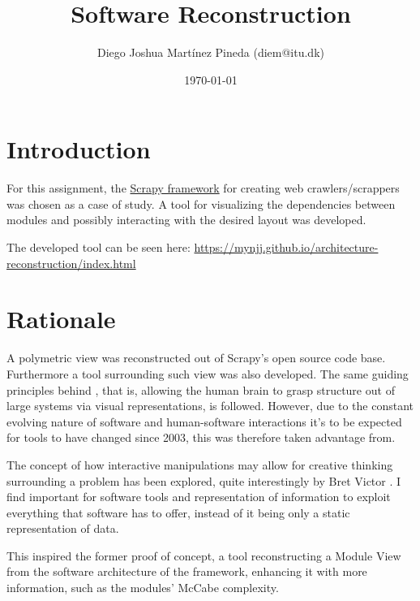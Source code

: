 \documentclass[a4paper,11pt]{article}
\author{Diego Joshua Martínez Pineda (diem@itu.dk)}
\date{\today}
\title{Software Reconstruction}
\begin{document}
\maketitle

\section{Introduction}
\label{sec:org0b5f54f}

For this assignment, the \href{https://scrapy.org/}{Scrapy framework} for creating web crawlers/scrappers was chosen as a case of study. A tool for visualizing the dependencies between modules and possibly interacting with the desired layout was developed.

The developed tool can be seen here: \url{https://mynjj.github.io/architecture-reconstruction/index.html}

\section{Rationale}
\label{sec:org0c548db}

\label{rationale}
A polymetric view was reconstructed out of Scrapy's open source code base. Furthermore a tool surrounding such view was also developed. The same guiding principles behind \cite{poly}, that is, allowing the human brain to grasp structure out of large systems via visual representations, is followed. However, due to the constant evolving nature of software and human-software interactions it's to be expected for tools to have changed since 2003, this was therefore taken advantage from.

The concept of how interactive manipulations may allow for creative thinking surrounding a problem has been explored, quite interestingly by Bret Victor \cite{dynamic} \cite{deadfish}. I find important for software tools and representation of information to exploit everything that software has to offer, instead of it being only a static representation of data.

This inspired the former proof of concept, a tool reconstructing a Module View from the software architecture of the framework, enhancing it with more information, such as the modules' McCabe complexity.
\end{document}
